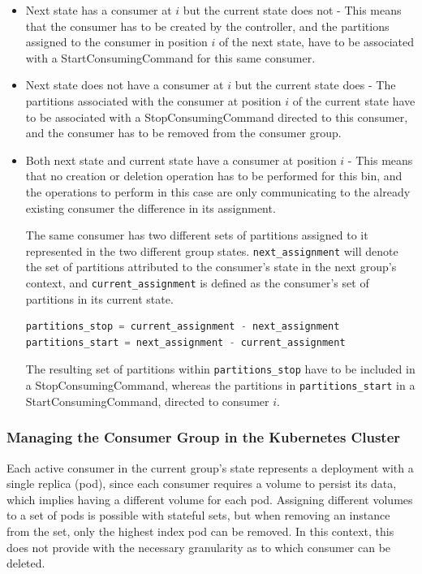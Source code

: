 \begin{itemize} 
    \item Next state has a consumer at $i$ but the current state does not - This
        means that the consumer has to be created by the controller, and the
        partitions assigned to the consumer in position $i$ of the next state,
        have to be associated with a StartConsumingCommand for this same
        consumer.  
    \item Next state does not have a consumer at $i$ but the current state
        does - The partitions associated with the consumer at position $i$ of
        the current state have to be associated with a StopConsumingCommand
        directed to this consumer, and the consumer has to be removed from the
        consumer group.  
    \item Both next state and current state have a consumer at position $i$ -
        This means that no creation or deletion operation has to be performed
        for this bin, and the operations to perform in this case are only
        communicating to the already existing consumer the difference in its
        assignment. 
    
        The same consumer has two different sets of partitions assigned to it
        represented in the two different group states.
        \lstinline[language=Python]{next_assignment} will denote the set of
        partitions attributed to the consumer's state in the next group's
        context, and \lstinline[language=Python]{current_assignment} is defined
        as the consumer's set of partitions in its current state.
    
\begin{lstlisting}[language=Python] 
partitions_stop = current_assignment - next_assignment 
partitions_start = next_assignment - current_assignment
\end{lstlisting} 
        The resulting set of partitions within \lstinline{partitions_stop} have
        to be included in a StopConsumingCommand, whereas the partitions in
        \lstinline{partitions_start} in a StartConsumingCommand, directed to
        consumer $i$.
\end{itemize}

\subsubsection{Managing the Consumer Group in the Kubernetes Cluster}

Each active consumer in the current group's state represents a deployment with
a single replica (pod), since each consumer requires a volume to persist its
data, which implies having a different volume for each pod. Assigning different
volumes to a set of pods is possible with stateful sets, but when removing an
instance from the set, only the highest index pod can be removed. In this
context, this does not provide with the necessary granularity as to which
consumer can be deleted. 


